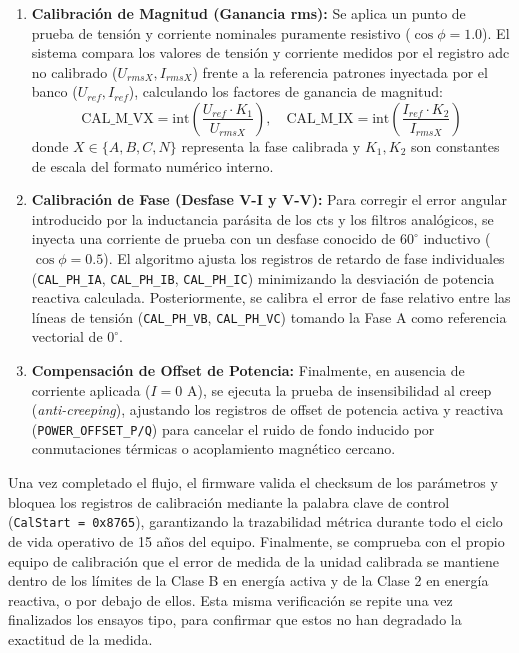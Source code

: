 \begin{enumerate}
    \item \textbf{Calibración de Magnitud (Ganancia \gls{rms}):} Se aplica un punto de prueba de tensión y corriente nominales puramente resistivo ($\cos\phi = 1.0$). El sistema compara los valores de tensión y corriente medidos por el registro \gls{adc} no calibrado ($U_{rmsX}, I_{rmsX}$) frente a la referencia patrones inyectada por el banco ($U_{ref}, I_{ref}$), calculando los factores de ganancia de magnitud:
    \begin{equation}
        \text{CAL\_M\_VX} = \text{int} \left( \frac{U_{ref} \cdot K_1}{U_{rmsX}} \right), \quad \text{CAL\_M\_IX} = \text{int} \left( \frac{I_{ref} \cdot K_2}{I_{rmsX}} \right)
    \end{equation}
    donde $X \in \{A, B, C, N\}$ representa la fase calibrada y $K_1, K_2$ son constantes de escala del formato numérico interno.

    \item \textbf{Calibración de Fase (Desfase V-I y V-V):} Para corregir el error angular introducido por la inductancia parásita de los \glspl{ct} y los filtros analógicos, se inyecta una corriente de prueba con un desfase conocido de $60^\circ$ inductivo ($\cos\phi = 0.5$). El algoritmo ajusta los registros de retardo de fase individuales (\texttt{CAL\_PH\_IA}, \texttt{CAL\_PH\_IB}, \texttt{CAL\_PH\_IC}) minimizando la desviación de potencia reactiva calculada. Posteriormente, se calibra el error de fase relativo entre las líneas de tensión (\texttt{CAL\_PH\_VB}, \texttt{CAL\_PH\_VC}) tomando la Fase A como referencia vectorial de $0^\circ$.

    \item \textbf{Compensación de Offset de Potencia:} Finalmente, en ausencia de corriente aplicada ($I = 0\text{ A}$), se ejecuta la prueba de insensibilidad al creep (\textit{anti-creeping}), ajustando los registros de offset de potencia activa y reactiva (\texttt{POWER\_OFFSET\_P/Q}) para cancelar el ruido de fondo inducido por conmutaciones térmicas o acoplamiento magnético cercano.
\end{enumerate}

Una vez completado el flujo, el firmware valida el checksum de los parámetros y bloquea los registros de calibración mediante la palabra clave de control (\texttt{CalStart = 0x8765}), garantizando la trazabilidad métrica durante todo el ciclo de vida operativo de 15 años del equipo. Finalmente, se comprueba con el propio equipo de calibración que el error de medida de la unidad calibrada se mantiene dentro de los límites de la Clase B en energía activa y de la Clase 2 en energía reactiva, o por debajo de ellos. Esta misma verificación se repite una vez finalizados los ensayos tipo, para confirmar que estos no han degradado la exactitud de la medida.


